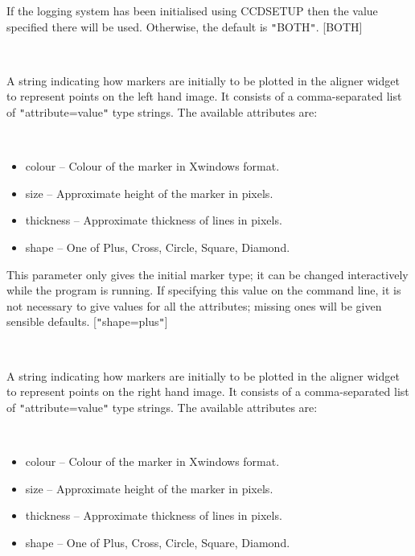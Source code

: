 \documentclass[twoside,11pt]{article}
\newcommand{\htmlref}[2]{#1}
\renewcommand{\_}{\texttt{\symbol{95}}}
\newcommand{\xroutine}[1]{\htmlref{{\sc #1}}{#1}}
\newcommand{\sstsubsection}[1]{ \item[{#1}] \mbox{} \\}
\newcommand{\sstitemlist}[1]{
  \mbox{} \\
  \vspace{-3.5ex}
  \begin{itemize}
     #1
  \end{itemize}
}
\newcommand{\sstitem}{\item}
\newcommand{\sstsubsection}[1]{\item[{#1}]}
\newcommand{\sstitemlist}[1]{
      \begin{itemize}
         #1
      \end{itemize}
      \\
   }
\newcommand{\sstitem}{\item}
\begin{document}
{{{{         }
         If the logging system has been initialised using \xroutine{CCDSETUP}
         then the value specified there will be used. Otherwise, the
         default is {\tt "}BOTH{\tt "}.
         [BOTH]
      }
      \sstsubsection{
         MARKSTYLE1 = LITERAL (Read and Write)
      }{
         A string indicating how markers are initially to be plotted in the
         aligner widget to represent points on the left hand image.
         It consists of a comma-separated list of {\tt "}attribute=value{\tt "} type 
         strings.  The available attributes are:
         \sstitemlist{

            \sstitem
               colour     -- Colour of the marker in Xwindows format.

            \sstitem
               size       -- Approximate height of the marker in pixels.

            \sstitem
               thickness  -- Approximate thickness of lines in pixels.

            \sstitem
               shape      -- One of Plus, Cross, Circle, Square, Diamond.

         }
         This parameter only gives the initial marker type; it can be
         changed interactively while the program is running.
         If specifying this value on the command line, it is not
         necessary to give values for all the attributes; missing ones
         will be given sensible defaults.
         [{\tt "}shape=plus{\tt "}]
      }
      \sstsubsection{
         MARKSTYLE2 = LITERAL (Read and Write)
      }{
         A string indicating how markers are initially to be plotted in the
         aligner widget to represent points on the right hand image.
         It consists of a comma-separated list of {\tt "}attribute=value{\tt "} type 
         strings.  The available attributes are:
         \sstitemlist{

            \sstitem
               colour     -- Colour of the marker in Xwindows format.

            \sstitem
               size       -- Approximate height of the marker in pixels.

            \sstitem
               thickness  -- Approximate thickness of lines in pixels.

            \sstitem
               shape      -- One of Plus, Cross, Circle, Square, Diamond.

}}}}
\end{document}
